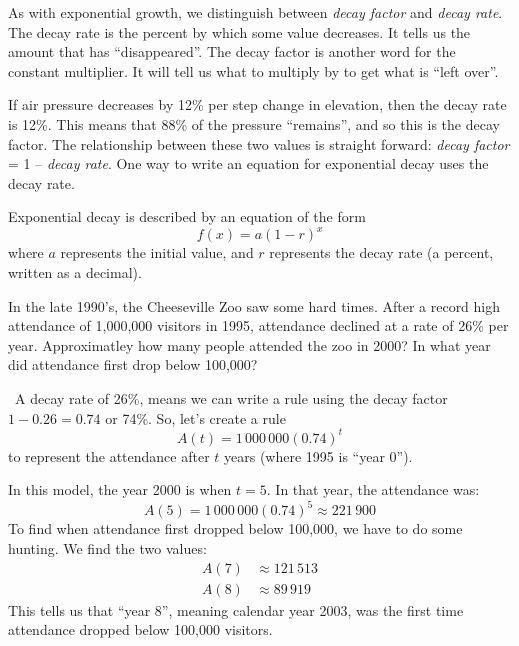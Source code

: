 As with exponential growth, we distinguish between \textit{decay factor} and \textit{decay rate}. The decay rate is the percent by which some value decreases. It tells us the amount that has ``disappeared''. The decay factor is another word for the constant multiplier. It will tell us what to multiply by to get what is ``left over''.

If air pressure decreases by 12\% per step change in elevation, then the decay rate is 12\%. This means that 88\% of the pressure ``remains'', and so this is the decay factor. The relationship between these two values is straight forward: \textit{decay factor} = 1 -- \textit{decay rate}. One way to write an equation for exponential decay uses the decay rate.

\begin{boxeddef}
Exponential decay is described by an equation of the form \[f(x)=a(1-r)^x\] where $a$ represents the initial value, and $r$ represents the decay rate (a percent, written as a decimal).
\end{boxeddef}

\begin{boxedex}
In the late 1990's, the Cheeseville Zoo saw some hard times. After a record high attendance of 1,000,000 visitors in 1995, attendance declined at a rate of 26\% per year. Approximatley how many people attended the zoo in 2000? In what year did attendance first drop below 100,000?

\exsoln\ A decay rate of 26\%, means we can write a rule using the decay factor $1-0.26 = 0.74$ or 74\%. So, let's create a rule \[A(t) = 1\,000\,000(0.74)^t\] to represent the attendance after $t$ years (where 1995 is ``year 0'').

In this model, the year 2000 is when $t=5$. In that year, the attendance was:
\[A(5) = 1\,000\,000(0.74)^5 \approx 221\,900\]
To find when attendance first dropped below 100,000, we have to do some hunting. We find the two values:
\[\begin{aligned}
A(7) &\approx 121\,513
\\
A(8) &\approx 89\,919
\end{aligned}\]
This tells us that ``year 8'', meaning calendar year 2003, was the first time attendance dropped below 100,000 visitors.
\end{boxedex}

